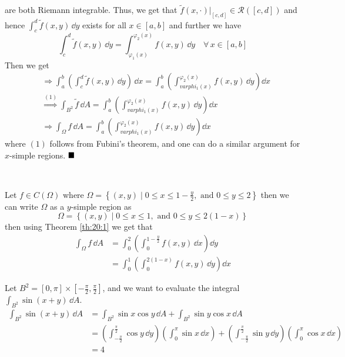 \documentclass[../Analysis-3]{subfiles}
\begin{document}
are both Riemann integrable. Thus, we get that $\tilde{f}(x,\cdot)\vert_{[c,d]} \in \mathscr{R}([c,d])$ and hence $\displaystyle{\int_c^d \tilde{f}(x,y) \, \dd y}$ exists for all $x \in [a,b]$ and further we have
\[
    \int_c^d \tilde{f}(x,y) \, \dd y = \int_{\varphi_1(x)}^{\varphi_2(x)} f(x,y) \, \dd y \quad \forall \, x \in [a,b]
\]
Then we get
\begin{align*}
     & \Longrightarrow \int_a^b \left( \int_c^d \tilde{f}(x,y) \, \dd y\right)\, \dd x = \int_a^b \left( \int_{varphi_1(x)}^{\varphi_2(x)} f(x,y) \, \dd y\right) \dd x \\
     & \overset{(1)}{\Longrightarrow} \int_{B^2} \tilde{f} \, \dd A = \int_a^b \left( \int_{varphi_1(x)}^{\varphi_2(x)} f(x,y) \, \dd y\right) \dd x                    \\
     & \Longrightarrow \int_{\Omega} f \, \dd A = \int_a^b \left( \int_{varphi_1(x)}^{\varphi_2(x)} f(x,y) \, \dd y\right) \dd x
\end{align*}
where $(1)$ follows from Fubini's theorem, and one can do a similar argument for $x$-simple regions. $\hfill \blacksquare$

\

\begin{Eg}{}{}
    Let $f \in C(\Omega)$ where $\Omega = \left\{ (x,y) \mid 0 \leq x \leq 1 - \frac{y}{2}, \mbox{ and } 0 \leq y \leq 2 \right\}$ then we can write $\Omega$ as a $y$-simple region as
    \[
        \Omega = \left\{ (x,y) \mid 0 \leq x \leq 1, \mbox{ and } 0 \leq y \leq 2(1-x) \right\}
    \]
    then using Theorem \ref{th:20:1} we get that
    \begin{align*}
        \int_{\Omega} f \, \dd A & = \int_0^2 \left( \int_0^{1-\frac{y}{2}} f(x,y) \, \dd x\right) \dd y \\
                                 & = \int_0^1 \left( \int_0^{2(1-x)} f(x,y) \, \dd y\right) \dd x
    \end{align*}
\end{Eg}

\begin{Eg}{}{}
    Let $B^2 = [0,\pi] \times [-\frac{\pi}{2}, \frac{\pi}{2}]$, and we want to evaluate the integral $\int_{B^2} \sin (x+y) \, \dd A$.
    \begin{align*}
        \int_{B^2}\sin(x+y) \, \dd A & = \int_{B^2} \sin x \cos y \, \dd A + \int_{B^2} \sin y \cos x \, \dd A                                                                                                                                                             \\
                                     & = \left( \int_{-\frac{\pi}{2}}^{\frac{\pi}{2}} \cos y \, \dd y\right)\left( \int_{0}^{\pi} \sin x \, \dd x\right) + \left( \int_{-\frac{\pi}{2}}^{\frac{\pi}{2}} \sin y \, \dd y\right)\left( \int_{0}^{\pi} \cos x \, \dd x\right) \\
                                     & = 4
    \end{align*}
\end{Eg}
\end{document}
